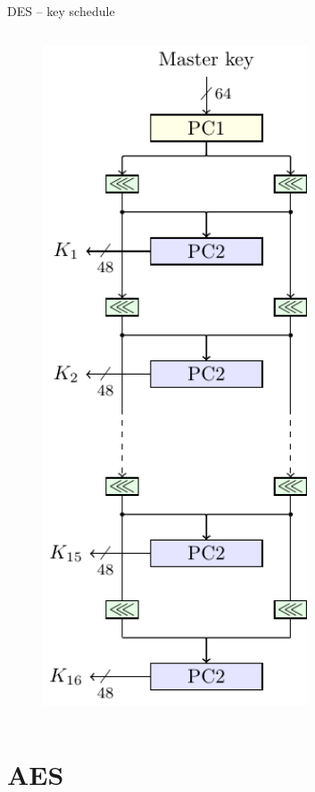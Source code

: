 \begin{frame}{DES -- key schedule}
\begin{columns}[T]
\begin{column}{.5\textwidth}
\begin{figure}
    \includegraphics[width=0.7\textwidth]{fig/DES_KS.pdf}
\end{figure}
\end{column}%
\end{columns}
\end{frame}

\section{AES}
\begin{frame}{\VideoName}
    \tableofcontents[currentsection]
\end{frame}

